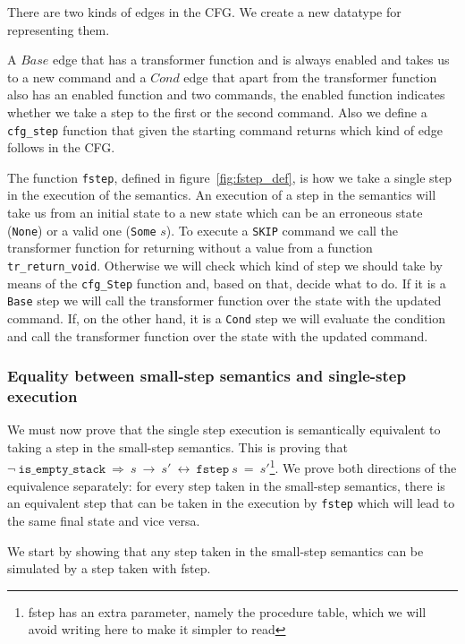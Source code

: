 There are two kinds of edges in the CFG.
We create a new datatype for representing them.


A $Base$ edge that has a transformer function and is always enabled and takes us to a new command and a $Cond$ edge that apart from the transformer function also has an enabled function and two commands, the enabled function indicates whether we take a step to the first or the second command.
Also we define a \verb|cfg_step| function that given the starting command returns which kind of edge follows in the CFG.

The function \verb|fstep|, defined in figure~\ref{fig:fstep_def}, is how we take a single step in the execution of the semantics.
An execution of a step in the semantics will take us from an initial state to a new state which can be an erroneous state (\verb|None|) or a valid one (\verb|Some| $s$).
To execute a \verb|SKIP| command we call the transformer function for returning without a value from a function \verb|tr_return_void|.
Otherwise we will check which kind of step we should take by means of the \verb|cfg_Step| function and, based on that, decide what to do.
If it is a \verb|Base| step we will call the transformer function over the state with the updated command.
If, on the other hand, it is a \verb|Cond| step we will evaluate the condition and call the transformer function over the state with the updated command.

\subsubsection{Equality between small-step semantics and single-step execution}\label{subsubsection:equality_ss_ss}

We must now prove that the single step execution is semantically equivalent to taking a step in the small-step semantics.
This is proving that $\neg\ \mathtt{is\_empty\_stack}\ \Longrightarrow\ s\ \rightarrow\ s'\ \longleftrightarrow\ \mathtt{fstep}\ s\ =\ s'$\footnote{fstep has an extra parameter, namely the procedure table, which we will avoid writing here to make it simpler to read}.
We prove both directions of the equivalence separately: for every step taken in the small-step semantics, there is an equivalent step that can be taken in the execution by \verb|fstep| which will lead to the same final state and vice versa.


We start by showing that any step taken in the small-step semantics can be simulated by a step taken with fstep.

